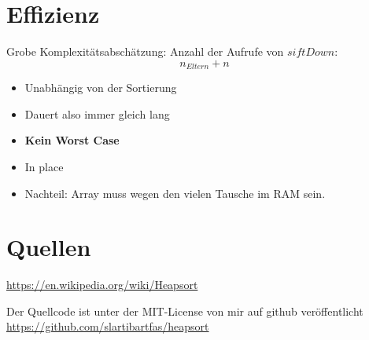 \documentclass[11pt,a4paper]{article}
\numberwithin{equation}{section}
\numberwithin{figure}{section}
\begin{document}
\section{Effizienz}
Grobe Komplexit\"atsabsch\"atzung: Anzahl der Aufrufe von $siftDown$:
\[ n_{Eltern}+n\]
\begin{itemize}
\item Unabh\"angig von der Sortierung
\item Dauert also immer gleich lang
\item \textbf{Kein Worst Case}
\item In place
\item Nachteil: Array muss wegen den vielen Tausche im RAM sein.
\end{itemize}

\section*{Quellen}
\url{https://en.wikipedia.org/wiki/Heapsort}

Der Quellcode ist unter der MIT-License von mir auf github ver\"offentlicht\\
\url{https://github.com/slartibartfas/heapsort}
\end{document}

